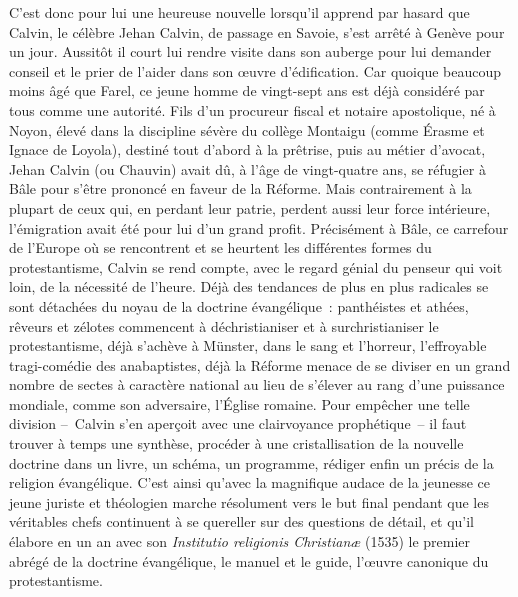 \documentclass[french,twoside]{book} %
\begin{document}
\noindent C’est donc pour lui une heureuse nouvelle lorsqu’il apprend par hasard que Calvin, le célèbre Jehan Calvin, de passage en Savoie, s’est arrêté à Genève pour un jour. Aussitôt il court lui rendre visite dans son auberge pour lui demander conseil et le prier de l’aider dans son œuvre d’édification. Car quoique beaucoup moins âgé que Farel, ce jeune homme de vingt-sept ans est déjà considéré par tous comme une autorité. Fils d’un procureur fiscal et notaire apostolique, né à Noyon, élevé dans la discipline sévère du collège Montaigu (comme Érasme et Ignace de Loyola), destiné tout d’abord à la prêtrise, puis au métier d’avocat, Jehan Calvin (ou Chauvin) avait dû, à l’âge de vingt-quatre ans, se réfugier à Bâle pour s’être prononcé en faveur de la Réforme. Mais contrairement à la plupart de ceux qui, en perdant leur patrie, perdent aussi leur force intérieure, l’émigration avait été pour lui d’un grand profit. Précisément à Bâle, ce carrefour de l’Europe où se rencontrent et se heurtent les différentes formes du protestantisme, Calvin se rend compte, avec le regard génial du penseur qui voit loin, de la nécessité de l’heure. Déjà des tendances de plus en plus radicales se sont détachées du noyau de la doctrine évangélique : panthéistes et athées, rêveurs et zélotes commencent à déchristianiser et à surchristianiser le protestantisme, déjà s’achève à Münster, dans le sang et l’horreur, l’effroyable tragi-comédie des anabaptistes, déjà la Réforme menace de se diviser en un grand nombre de sectes à caractère national au lieu de s’élever au rang d’une puissance mondiale, comme son adversaire, l’Église romaine. Pour empêcher une telle division – Calvin s’en aperçoit avec une clairvoyance prophétique – il faut trouver à temps une synthèse, procéder à une cristallisation de la nouvelle doctrine dans un livre, un schéma, un programme, rédiger enfin un précis de la religion évangélique. C’est ainsi qu’avec la magnifique audace de la jeunesse ce jeune juriste et théologien marche résolument vers le but final pendant que les véritables chefs continuent à se quereller sur des questions de détail, et qu’il élabore en un an avec son \emph{Institutio religionis Christianæ} (1535) le premier abrégé de la doctrine évangélique, le manuel et le guide, l’œuvre canonique du protestantisme.\par
\end{document}
